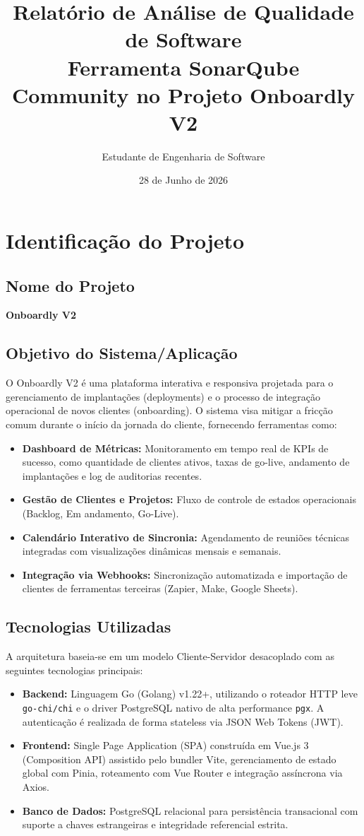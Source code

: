 \documentclass[12pt,a4paper]{article}
\title{Relatório de Análise de Qualidade de Software\\
\large Ferramenta SonarQube Community no Projeto Onboardly V2}
\author{Estudante de Engenharia de Software}
\date{28 de Junho de 2026}
\begin{document}
\maketitle
\newpage
\tableofcontents
\newpage

\section{Identificação do Projeto}

\subsection{Nome do Projeto}
\textbf{Onboardly V2}

\subsection{Objetivo do Sistema/Aplicação}
O Onboardly V2 é uma plataforma interativa e responsiva projetada para o gerenciamento de implantações (deployments) e o processo de integração operacional de novos clientes (onboarding). O sistema visa mitigar a fricção comum durante o início da jornada do cliente, fornecendo ferramentas como:
\begin{itemize}
    \item \textbf{Dashboard de Métricas:} Monitoramento em tempo real de KPIs de sucesso, como quantidade de clientes ativos, taxas de go-live, andamento de implantações e log de auditorias recentes.
    \item \textbf{Gestão de Clientes e Projetos:} Fluxo de controle de estados operacionais (Backlog, Em andamento, Go-Live).
    \item \textbf{Calendário Interativo de Sincronia:} Agendamento de reuniões técnicas integradas com visualizações dinâmicas mensais e semanais.
    \item \textbf{Integração via Webhooks:} Sincronização automatizada e importação de clientes de ferramentas terceiras (Zapier, Make, Google Sheets).
\end{itemize}

\subsection{Tecnologias Utilizadas}
A arquitetura baseia-se em um modelo Cliente-Servidor desacoplado com as seguintes tecnologias principais:
\begin{itemize}
    \item \textbf{Backend:} Linguagem Go (Golang) v1.22+, utilizando o roteador HTTP leve \texttt{go-chi/chi} e o driver PostgreSQL nativo de alta performance \texttt{pgx}. A autenticação é realizada de forma stateless via JSON Web Tokens (JWT).
    \item \textbf{Frontend:} Single Page Application (SPA) construída em Vue.js 3 (Composition API) assistido pelo bundler Vite, gerenciamento de estado global com Pinia, roteamento com Vue Router e integração assíncrona via Axios.
    \item \textbf{Banco de Dados:} PostgreSQL relacional para persistência transacional com suporte a chaves estrangeiras e integridade referencial estrita.
\end{itemize}
\end{document}
